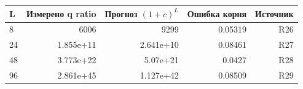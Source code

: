 \begin{tabular}{lrrrr}
\toprule
L & Измерено q ratio & Прогноз $(1+c)^L$ & Ошибка корня & Источник \\
\midrule
8 & 6006 & 9299 & 0.05319 & R26 \\
24 & 1.855e+11 & 2.641e+10 & 0.08461 & R27 \\
48 & 3.773e+22 & 5.07e+21 & 0.0427 & R28 \\
96 & 2.861e+45 & 1.127e+42 & 0.08509 & R29 \\
\bottomrule
\end{tabular}